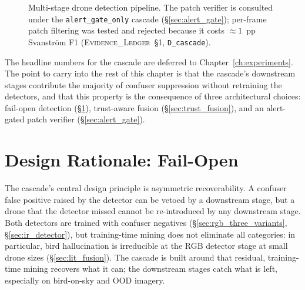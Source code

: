 \documentclass[12pt,a4paper,oneside,openright]{book}
\begin{document}
\begin{figure}[htbp]
    \centering
    \caption{Multi-stage drone detection pipeline. The patch verifier is consulted under the \texttt{alert\_gate\_only} cascade (\S\ref{sec:alert_gate}); per-frame patch filtering was tested and rejected because it costs $\approx 1$~pp Svanstr\"om F1 (\textsc{Evidence\_Ledger}~\S1, \texttt{D\_cascade}).}
    \label{fig:pipeline}
\end{figure}

The headline numbers for the cascade are deferred to Chapter~\ref{ch:experiments}. The point to carry into the rest of this chapter is that the cascade's downstream stages contribute the majority of confuser suppression without retraining the detectors, and that this property is the consequence of three architectural choices: fail-open detection (\S\ref{sec:design_rationale}), trust-aware fusion (\S\ref{sec:trust_fusion}), and an alert-gated patch verifier (\S\ref{sec:alert_gate}).

\section{Design Rationale: Fail-Open}
\label{sec:design_rationale}

The cascade's central design principle is asymmetric recoverability. A confuser false positive raised by the detector can be vetoed by a downstream stage, but a drone that the detector missed cannot be re-introduced by any downstream stage. Both detectors are trained with confuser negatives (\S\ref{sec:rgb_three_variants}, \S\ref{sec:ir_detector}), but training-time mining does not eliminate all categories: in particular, bird hallucination is irreducible at the RGB detector stage at small drone sizes (\S\ref{sec:lit_fusion}). The cascade is built around that residual, training-time mining recovers what it can; the downstream stages catch what is left, especially on bird-on-sky and OOD imagery.
\end{document}
